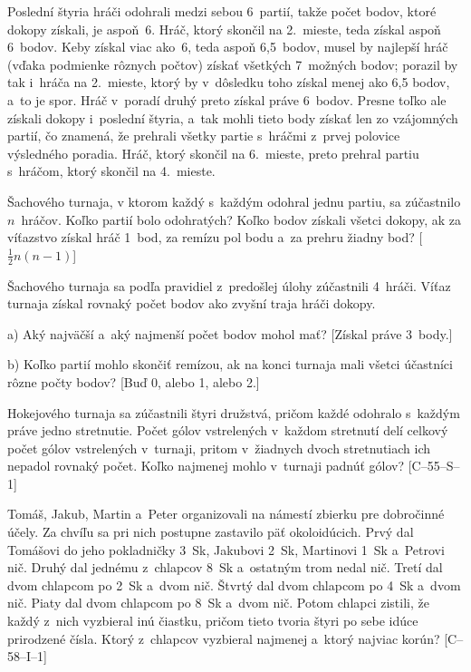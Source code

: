 {%
Poslední štyria hráči odohrali medzi sebou 6~partií,
takže počet bodov, ktoré dokopy získali, je aspoň~6. Hráč, ktorý
skončil na 2.~mieste, teda získal aspoň 6~bodov.
Keby získal viac ako~6, teda aspoň 6{,}5~bodov, musel by
najlepší hráč (vďaka podmienke rôznych počtov) získať všetkých 7~možných
bodov; porazil by tak i~hráča na 2.~mieste, ktorý by v~dôsledku toho získal menej
ako 6{,}5 bodov, a~to je spor. Hráč v~poradí
druhý preto získal práve 6~bodov. Presne toľko ale získali dokopy
i~poslední štyria, a~tak mohli tieto body získať len zo vzájomných partií, čo znamená,
že prehrali všetky partie s~hráčmi z~prvej polovice výsledného poradia.
Hráč, ktorý skončil na 6.~mieste, preto prehral partiu s~hráčom, ktorý
skončil na 4.~mieste.


Šachového turnaja, v ktorom každý s~každým odohral jednu partiu, sa
zúčastnilo $n$~hráčov. Koľko partií bolo odohratých? Koľko bodov
získali všetci dokopy, ak za
víťazstvo získal hráč 1~bod, za remízu pol bodu a~za prehru žiadny bod?
[$\frac12 n(n - 1)$]

Šachového turnaja sa podľa pravidiel z~predošlej úlohy zúčastnili 4~hráči.
Víťaz turnaja získal rovnaký počet bodov ako zvyšní traja hráči dokopy.
\item{a)} Aký najväčší a~aký najmenší počet bodov mohol mať? [Získal práve 3~body.]
\item{b)} Koľko partií mohlo skončiť remízou, ak na konci turnaja mali
všetci účastníci rôzne počty bodov? [Buď 0, alebo 1, alebo 2.]

Hokejového turnaja sa zúčastnili štyri družstvá, pričom každé
odohralo s~každým práve jedno stretnutie. Počet gólov vstrelených v~každom
stretnutí delí celkový počet gólov vstrelených v~turnaji, pritom
v~žiadnych dvoch stretnutiach ich nepadol rovnaký počet. Koľko najmenej mohlo
v~turnaji padnúť gólov? [C--55--S--1]

Tomáš, Jakub, Martin a~Peter organizovali na námestí zbierku pre
dobročinné účely. Za chvíľu sa pri nich postupne zastavilo päť
okoloidúcich. Prvý dal Tomášovi do jeho pokladničky 3~Sk, Jakubovi 2~Sk,
Martinovi 1~Sk a~Petrovi nič. Druhý dal jednému z~chlapcov 8~Sk a~ostatným
trom nedal nič. Tretí dal dvom chlapcom po 2~Sk a~dvom nič. Štvrtý
dal dvom chlapcom po 4~Sk a~dvom nič. Piaty dal dvom chlapcom po 8~Sk
a~dvom nič. Potom chlapci zistili, že každý z~nich vyzbieral inú
čiastku, pričom tieto tvoria štyri po sebe idúce prirodzené čísla. Ktorý
z~chlapcov vyzbieral najmenej a~ktorý najviac korún? [C--58--I--1]
}

